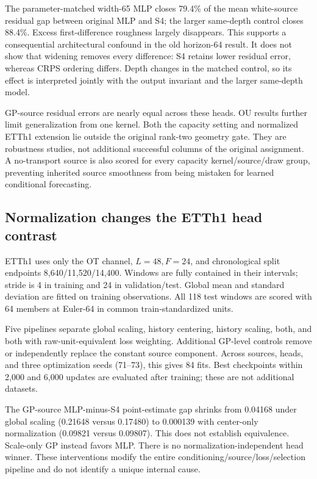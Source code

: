 \documentclass[10pt,twocolumn]{article}
\begin{document}
The parameter-matched width-65 MLP closes 79.4\% of the mean white-source residual gap between original MLP and S4; the larger same-depth control closes 88.4\%. Excess first-difference roughness largely disappears. This supports a consequential architectural confound in the old horizon-64 result. It does not show that widening removes every difference: S4 retains lower residual error, whereas CRPS ordering differs. Depth changes in the matched control, so its effect is interpreted jointly with the output invariant and the larger same-depth model.

GP-source residual errors are nearly equal across these heads. OU results further limit generalization from one kernel. Both the capacity setting and normalized ETTh1 extension lie outside the original rank-two geometry gate. They are robustness studies, not additional successful columns of the original assignment. A no-transport source is also scored for every capacity kernel/source/draw group, preventing inherited source smoothness from being mistaken for learned conditional forecasting.

\clearpage
\subsection{Normalization changes the ETTh1 head contrast}
ETTh1 uses only the OT channel, $L=48,F=24$, and chronological split endpoints 8,640/11,520/14,400. Windows are fully contained in their intervals; stride is 4 in training and 24 in validation/test. Global mean and standard deviation are fitted on training observations. All 118 test windows are scored with 64 members at Euler-64 in common train-standardized units.

Five pipelines separate global scaling, history centering, history scaling, both, and both with raw-unit-equivalent loss weighting. Additional GP-level controls remove or independently replace the constant source component. Across sources, heads, and three optimization seeds (71--73), this gives 84 fits. Best checkpoints within 2,000 and 6,000 updates are evaluated after training; these are not additional datasets.
\begin{table}[h]
\centering\small
\caption{ETTh1 fair CRPS at the 6,000-update budget. All pipelines are evaluated in the same units; smaller is better.}\label{tab:norm}
\end{table}

The GP-source MLP-minus-S4 point-estimate gap shrinks from 0.04168 under global scaling (0.21648 versus 0.17480) to 0.000139 with center-only normalization (0.09821 versus 0.09807). This does not establish equivalence. Scale-only GP instead favors MLP. There is no normalization-independent head winner. These interventions modify the entire conditioning/source/loss/selection pipeline and do not identify a unique internal cause.
\end{document}
